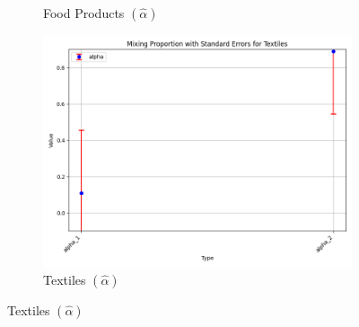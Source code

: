 \documentclass{article}
\begin{document}
\begin{figure}[ht!]
\begin{subfigure}[t]{0.32\textwidth}
        \caption{Food Products  $(\hat\alpha)$}
    \end{subfigure}
    \begin{subfigure}[t]{0.32\textwidth}
        \centering
        \includegraphics[width=\textwidth]{figure/empirical_ar1_normal_kmshare_ciiu_alpha_with_error_bars_Textiles.png}
        \caption{Textiles $(\hat\alpha)$}
    \end{subfigure}


\end{figure}
\end{document}
